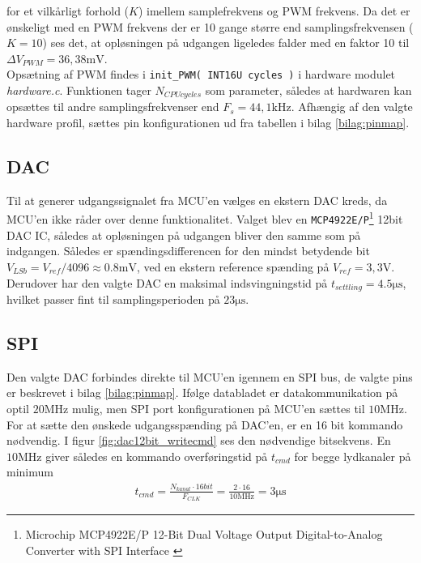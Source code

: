 for et vilkårligt forhold ($K$) imellem samplefrekvens og PWM frekvens. 
Da det er ønskeligt med en PWM frekvens der er 10 gange større end samplingsfrekvensen ($K=10$) ses det, at opløsningen på udgangen ligeledes falder med en faktor 10 til $\Delta V_{PWM} = 36,38\si{\milli\volt}$.\\

Opsætning af PWM findes i \texttt{init\_PWM( INT16U cycles )} i hardware modulet \textit{hardware.c}. Funktionen tager $N_{CPU cycles}$ som parameter, således at hardwaren kan opsættes til andre samplingsfrekvenser end $F_s = 44,1\si{\kilo\hertz}$.
Afhængig af den valgte hardware profil, sættes pin konfigurationen ud fra tabellen i bilag \ref{bilag:pinmap}.  

\FloatBlock


\subsection{DAC}
Til at generer udgangssignalet fra MCU'en vælges en ekstern DAC kreds, da MCU'en ikke råder over denne funktionalitet.
Valget blev en \texttt{MCP4922E/P}\footnote{Microchip MCP4922E/P 12-Bit Dual Voltage Output Digital-to-Analog Converter with SPI Interface \cite{mcp4922} } 12bit DAC IC, således at opløsningen på udgangen bliver den samme som på indgangen.
Således er spændingsdifferencen for den mindst betydende bit $ V_{LSb} = V_{ref} / 4096 \approx \num{0,8}\si{\milli\volt} $, ved en ekstern reference spænding på $V_{ref} = 3,3\si{\volt}$.
Derudover har den valgte DAC en maksimal indsvingningstid på $t_{settling} = \num{4.5}\si{\micro\second}$, hvilket passer fint til samplingsperioden på $23\si{\micro\second}$. 

\subsection{SPI}
Den valgte DAC forbindes direkte til MCU'en igennem en SPI bus, de valgte pins er beskrevet i bilag \ref{bilag:pinmap}.
Ifølge databladet er datakommunikation på optil $20\si{\mega\hertz}$ mulig, men SPI port konfigurationen på MCU'en sættes til $10\si{\mega\hertz}$.
For at sætte den ønskede udgangsspænding på DAC'en, er en 16 bit kommando nødvendig. 
I figur \ref{fig:dac12bit_writecmd} ses den nødvendige bitsekvens.
En $10\si{\mega\hertz}$ giver således en kommando overføringstid på $t_{cmd}$ for begge lydkanaler på minimum 
\begin{align}
	t_{cmd} = \frac{N_{kanal} \cdot 16bit}{F_{CLK}} = \frac{2 \cdot 16}{10\si{\mega\hertz}} = 3\si{\micro\second}
\end{align}

